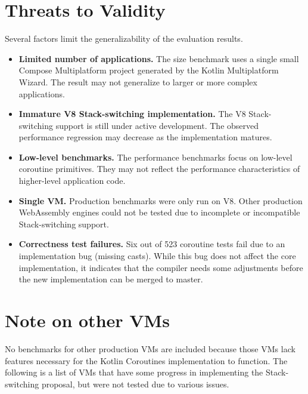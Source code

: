 \section{Threats to Validity}
\label{sec:threats}

Several factors limit the generalizability of the evaluation results.

\begin{itemize}
    \item \textbf{Limited number of applications.} The size benchmark uses a single small Compose Multiplatform
    project generated by the Kotlin Multiplatform Wizard. The result may not generalize to larger or more
    complex applications.
    \item \textbf{Immature V8 Stack-switching implementation.} The V8 Stack-switching support is still under
    active development. The observed performance regression may decrease as the implementation matures.
    \item \textbf{Low-level benchmarks.} The performance benchmarks focus on low-level coroutine primitives.
    They may not reflect the performance characteristics of higher-level application code.
    \item \textbf{Single VM.} Production benchmarks were only run on V8. Other production WebAssembly engines
    could not be tested due to incomplete or incompatible Stack-switching support.
    \item \textbf{Correctness test failures.} Six out of 523 coroutine tests fail due to an implementation bug
    (missing  casts). While this bug does not affect the core implementation, it indicates that the
    compiler needs some adjustments before the new implementation can be merged to master.
\end{itemize}

\section{Note on other VMs}

No benchmarks for other production VMs are included because those VMs lack features necessary for the
Kotlin Coroutines implementation to function. The following is a list of VMs that have some progress in implementing
the Stack-switching proposal, but were not tested due to various issues.

